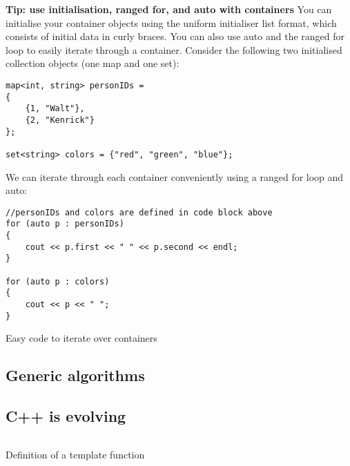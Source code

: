 \noindent
\textbf{Tip: use initialisation, ranged for, and auto with containers}
You can initialise your container objects using the uniform initialiser list format, which consists
of initial data in curly braces. You can also use auto and the ranged for loop to easily iterate
through a container. Consider the following two initialised collection objects (one map and one set):

\begin{verbatim}
map<int, string> personIDs =
{
	{1, "Walt"},
	{2, "Kenrick"}
};

set<string> colors = {"red", "green", "blue"};
\end{verbatim}

We can iterate through each container conveniently using a ranged for loop
and auto:

\begin{listing}[H]
\begin{verbatim}
//personIDs and colors are defined in code block above
for (auto p : personIDs)
{
	cout << p.first << " " << p.second << endl; 	
}

for (auto p : colors)
{
	cout << p << " ";
}
\end{verbatim}
\caption{Easy code to iterate over containers}
\label{source_code_1}
\end{listing}


\subsection{Generic algorithms}







\subsection{C++ is evolving}








































\begin{listing}[H]
\begin{verbatim}

\end{verbatim}
\caption{Definition of a template function}
\label{source_code_1}
\end{listing}